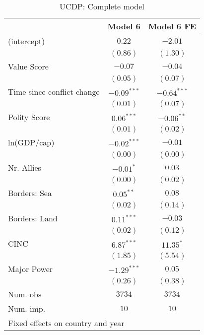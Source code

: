 
\begin{table}
\begin{center}
\begin{tabular}{l c c}
\toprule
 & Model 6 & Model 6 FE \\
\midrule
(intercept)                & $0.22$        & $-2.01$       \\
                           & $(0.86)$      & $(1.30)$      \\
Value Score                & $-0.07$       & $-0.04$       \\
                           & $(0.05)$      & $(0.07)$      \\
Time since conflict change & $-0.09^{***}$ & $-0.64^{***}$ \\
                           & $(0.01)$      & $(0.07)$      \\
Polity Score               & $0.06^{***}$  & $-0.06^{**}$  \\
                           & $(0.01)$      & $(0.02)$      \\
ln(GDP/cap)                & $-0.02^{***}$ & $-0.01$       \\
                           & $(0.00)$      & $(0.00)$      \\
Nr. Allies                 & $-0.01^{*}$   & $0.03$        \\
                           & $(0.00)$      & $(0.02)$      \\
Borders: Sea               & $0.05^{**}$   & $0.08$        \\
                           & $(0.02)$      & $(0.14)$      \\
Borders: Land              & $0.11^{***}$  & $-0.03$       \\
                           & $(0.02)$      & $(0.12)$      \\
CINC                       & $6.87^{***}$  & $11.35^{*}$   \\
                           & $(1.85)$      & $(5.54)$      \\
Major Power                & $-1.29^{***}$ & $0.05$        \\
                           & $(0.26)$      & $(0.38)$      \\
\midrule
Num. obs                   & $3734$        & $3734$        \\
Num. imp.                  & $10$          & $10$          \\
\bottomrule
\multicolumn{3}{l}{\scriptsize{%
               Fixed effects on country and year}}
\end{tabular}
\caption{UCDP: Complete model}
\label{UCDP_3}
\end{center}
\end{table}

